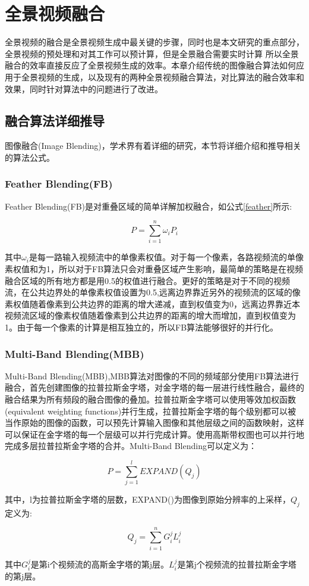\chapter{全景视频融合}
全景视频的融合是全景视频生成中最关键的步骤，同时也是本文研究的重点部分，全景视频的预处理和对其工作可以预计算，但是全景融合需要实时计算
所以全景融合的效率直接反应了全景视频生成的效率。本章介绍传统的图像融合算法如何应用于全景视频的生成，以及现有的两种全景视频融合算法，对比算法的融合效率和效果，同时针对算法中的问题进行了改进。

\section{融合算法详细推导}
图像融合(Image Blending)，学术界有着详细的研究，本节将详细介绍和推导相关的算法公式。
\subsection{Feather Blending(FB)}
Feather Blending(FB)是对重叠区域的简单详解加权融合，如公式\ref{feather}所示:
\begin{center}
    \begin{equation}\label{feather}
        P=\sum_{i=1}^{n}\omega_iP_i
    \end{equation}
\end{center}
其中$\omega_i$是每一路输入视频流中的单像素权值。对于每一个像素，各路视频流的单像素权值和为1，所以对于FB算法只会对重叠区域产生影响，最简单的策略是在视频融合区域的所有地方都是用0.5的权值进行融合。更好的策略是对于不同的视频流，在公共边界处的单像素权值设置为0.5,远离边界靠近另外的视频流的区域的像素权值随着像素到公共边界的距离的增大递减，直到权值变为0，远离边界靠近本视频流区域的像素权值随着像素到公共边界的距离的增大而增加，直到权值变为1。由于每一个像素的计算是相互独立的，所以FB算法能够很好的并行化。
\subsection{Multi-Band Blending(MBB)}
Multi-Band Blending(MBB),MBB算法对图像的不同的频域部分使用FB算法进行融合，首先创建图像的拉普拉斯金字塔，对金字塔的每一层进行线性融合，最终的融合结果为所有频段的融合图像的叠加。拉普拉斯金字塔可以使用等效加权函数(equivalent weighting functions)并行生成，拉普拉斯金字塔的每个级别都可以被当作原始的图像的函数，可以预先计算输入图像和其他层级之间的函数映射，这样可以保证在金字塔的每一个层级可以并行完成计算。使用高斯带权图也可以并行地完成多层拉普拉斯金字塔的合并。Multi-Band Blending可以定义为：
\begin{center}
    \begin{equation}\label{mbb}
        P=\sum_{j=1}^{l}EXPAND(Q_j)
    \end{equation}
\end{center}
其中，l为拉普拉斯金字塔的层数，EXPAND()为图像到原始分辨率的上采样，$Q_j$定义为:
\begin{center}
    \begin{equation}\label{mbbQ}
        Q_j=\sum_{i=1}^{n}G_i^jL_i^j
    \end{equation}
\end{center}
其中$G_i^j$是第i个视频流的高斯金字塔的第j层。$L_i^j$是第j个视频流的拉普拉斯金字塔的第j层。
